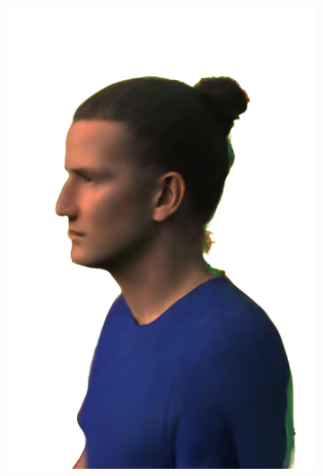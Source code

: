 \begin{figure}[ht]
\begin{subfigure}{0.2\linewidth}
		\includegraphics[width=\textwidth]{Figures/results/high/ephra_3d/24_render.png}
	\end{subfigure}
	\begin{subfigure}{0.2\linewidth}

\end{subfigure}
\end{figure}
